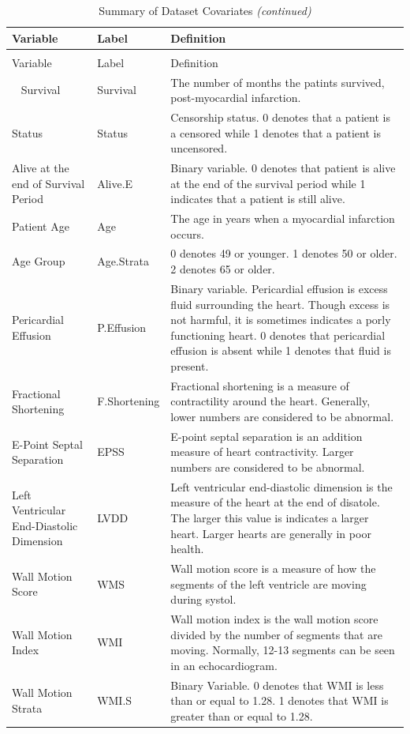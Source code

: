 \documentclass[
]{article}
\begin{document}
\begin{longtabu} to 
\caption{\label{tab:Dataset.summary}Summary of Dataset Covariates}\\
\toprule
Variable & Label & Definition\\
\midrule
\endfirsthead
\caption[]{Summary of Dataset Covariates \textit{(continued)}}\\
\toprule
Variable & Label & Definition\\
\midrule
\endhead
\
\endfoot
\bottomrule
\endlastfoot
Survival & Survival & The number of months the patints survived, post-myocardial infarction.\\
\addlinespace
Status & Status & Censorship status. 0 denotes that a patient is a censored while 1 denotes that a patient is uncensored.\\
\addlinespace
Alive at the end of Survival Period & Alive.E & Binary variable. 0 denotes that patient is alive at the end of the survival period while 1 indicates that a patient is still alive.\\
\addlinespace
Patient Age & Age & The age in years when a myocardial infarction occurs.\\
\addlinespace
Age Group & Age.Strata & 0 denotes 49 or younger. 1 denotes 50 or older. 2 denotes 65 or older.\\
\addlinespace
Pericardial Effusion & P.Effusion & Binary variable. Pericardial effusion is excess fluid surrounding the heart. Though excess is not harmful, it is sometimes indicates a porly functioning heart. 0 denotes that pericardial effusion is absent while 1 denotes that fluid is present.\\
\addlinespace
Fractional Shortening & F.Shortening & Fractional shortening is a measure of contractility around the heart. Generally, lower numbers are considered to be abnormal.\\
\addlinespace
E-Point Septal Separation & EPSS & E-point septal separation is an addition measure of heart contractivity. Larger numbers are considered to be abnormal.\\
\addlinespace
Left Ventricular End-Diastolic Dimension & LVDD & Left ventricular end-diastolic dimension is the measure of the heart at the end of disatole. The larger this value is indicates a larger heart. Larger hearts are generally in poor health.\\
\addlinespace
Wall Motion Score & WMS & Wall motion score is a measure of how the segments of the left ventricle are moving during systol.\\
\addlinespace
Wall Motion Index & WMI & Wall motion index is the wall motion score divided by the number of segments that are moving. Normally, 12-13 segments can be seen in an echocardiogram.\\
\addlinespace
Wall Motion Strata & WMI.S & Binary Variable. 0 denotes that WMI is less than or equal to 1.28. 1 denotes that WMI is greater than or equal to 1.28.\\*
\end{longtabu}
\end{document}

